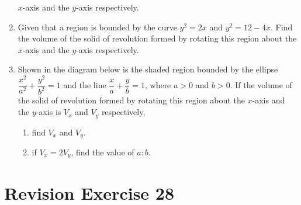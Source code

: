 \documentclass{report}
\begin{document}
\begin{enumerate}[resume]
          $x$-axis and the $y$-axis respectively.
    \item Given that a region is bounded by the curve $y^2=2 x$ and $y^2=12-4 x$. Find
          the volume of the solid of revolution formed by rotating this region about the
          $x$-axis and the $y$-axis respectively.
    \item Shown in the diagram below is the shaded region bounded by the ellipse
          $\dfrac{x^2}{a^2} + \dfrac{y^2}{b^2} = 1$ and the line $\dfrac{x}{a} +
              \dfrac{y}{b} = 1$, where $a > 0$ and $b > 0$. If the volume of the solid of
          revolution formed by rotating this region about the $x$-axis and the $y$-axis
          is $V_x$ and $V_y$ respectively,
          \begin{enumerate}
              \item find $V_x$ and $V_y$.
              \item if $V_x = 2V_y$, find the value of $a:b$.
          \end{enumerate}

\end{enumerate}

\section{Revision Exercise 28}
\end{document}
